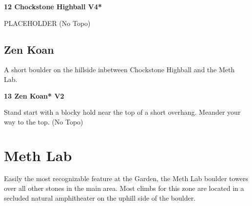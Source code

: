 \begin{multicols}{2}
\begin{minipage}{\columnwidth}
			\end{minipage}
			
					\begin{minipage}{\linewidth}	
					\label{rt:Chockstone Highball}
\colorbox{RoyalBlue!20}{
\parbox{0.95\textwidth}{
\textbf{
12 Chockstone Highball V4*  
}
}
}

					\begin{adjustwidth}{0.5cm}{}				
					PLACEHOLDER
						\newline (No Topo) 
					\end{adjustwidth}
					\end{minipage}
			\begin{minipage}{\columnwidth}
			\subsection*{Zen Koan}\label{bf:Zen Koan}
			A short boulder on the hillside inbetween Chockstone Highball and the Meth Lab.
			
			\end{minipage}
			
					\begin{minipage}{\linewidth}	
					\label{rt:Zen Koan}
\colorbox{green!20}{
\parbox{0.95\textwidth}{
\textbf{
13 Zen Koan* V2    
}
}
}

					\begin{adjustwidth}{0.5cm}{}				
					Stand start with a blocky hold near the top of a short overhang. Meander your way to the top.
						\newline (No Topo) 
					\end{adjustwidth}
					\end{minipage}
\newpage

		\section{Meth Lab}\label{sa:Meth Lab}
	\begin{minipage}{\columnwidth}
	Easily the most recognizable feature at the Garden, the Meth Lab boulder towers over all other stones in the main area. Most climbs for this zone are located in a secluded natural amphitheater on the uphill side of the boulder.
	\end{minipage}
	

			\begin{minipage}{\columnwidth}

\end{minipage}
\end{multicols}
